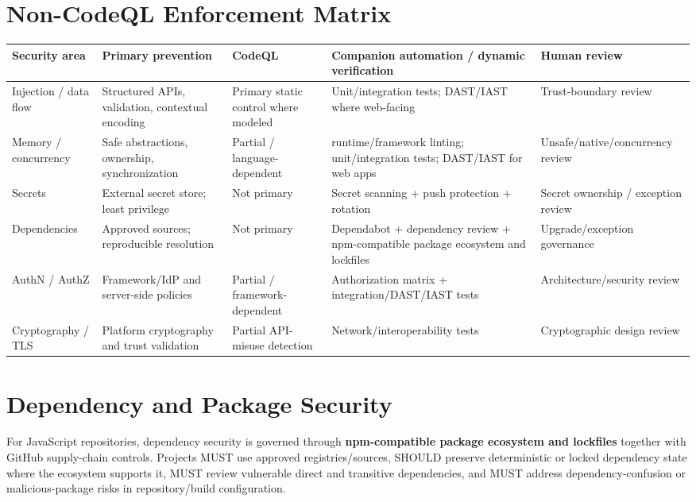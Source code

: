 \documentclass[10pt,letterpaper]{article}
\begin{document}
\section{Non-CodeQL Enforcement Matrix}
\begin{tabularx}{\textwidth}{@{}P{1.22in}Y P{1.55in} P{1.55in} P{1.5in}@{}}
\toprule
\textbf{Security area} & \textbf{Primary prevention} & \textbf{CodeQL} & \textbf{Companion automation / dynamic verification} & \textbf{Human review}\\
\midrule
Injection / data flow & Structured APIs, validation, contextual encoding & Primary static control where modeled & Unit/integration tests; DAST/IAST where web-facing & Trust-boundary review\\
Memory / concurrency & Safe abstractions, ownership, synchronization & Partial / language-dependent & runtime/framework linting; unit/integration tests; DAST/IAST for web apps & Unsafe/native/concurrency review\\
Secrets & External secret store; least privilege & Not primary & Secret scanning + push protection + rotation & Secret ownership / exception review\\
Dependencies & Approved sources; reproducible resolution & Not primary & Dependabot + dependency review + npm-compatible package ecosystem and lockfiles & Upgrade/exception governance\\
AuthN / AuthZ & Framework/IdP and server-side policies & Partial / framework-dependent & Authorization matrix + integration/DAST/IAST tests & Architecture/security review\\
Cryptography / TLS & Platform cryptography and trust validation & Partial API-misuse detection & Network/interoperability tests & Cryptographic design review\\
\bottomrule
\end{tabularx}

\section{Dependency and Package Security}
For JavaScript repositories, dependency security is governed through \textbf{npm-compatible package ecosystem and lockfiles} together with GitHub supply-chain controls. Projects MUST use approved registries/sources, SHOULD preserve deterministic or locked dependency state where the ecosystem supports it, MUST review vulnerable direct and transitive dependencies, and MUST address dependency-confusion or malicious-package risks in repository/build configuration.
\end{document}
